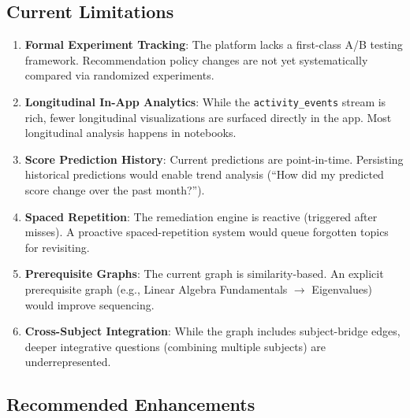 \documentclass[sigconf,authordraft,twoside]{acmart}
\newcommand{\tech}[1]{\textcolor{brandblue}{\nolinkurl{#1}}}
\begin{document}
\subsection{Current Limitations}

\begin{enumerate}
\item \textbf{Formal Experiment Tracking}: The platform lacks a first-class A/B testing framework. Recommendation policy changes are not yet systematically compared via randomized experiments.

\item \textbf{Longitudinal In-App Analytics}: While the \tech{activity\_events} stream is rich, fewer longitudinal visualizations are surfaced directly in the app. Most longitudinal analysis happens in notebooks.

\item \textbf{Score Prediction History}: Current predictions are point-in-time. Persisting historical predictions would enable trend analysis (``How did my predicted score change over the past month?'').

\item \textbf{Spaced Repetition}: The remediation engine is reactive (triggered after misses). A proactive spaced-repetition system would queue forgotten topics for revisiting.

\item \textbf{Prerequisite Graphs}: The current graph is similarity-based. An explicit prerequisite graph (e.g., Linear Algebra Fundamentals $\to$ Eigenvalues) would improve sequencing.

\item \textbf{Cross-Subject Integration}: While the graph includes subject-bridge edges, deeper integrative questions (combining multiple subjects) are underrepresented.
\end{enumerate}

\subsection{Recommended Enhancements}
\end{document}
